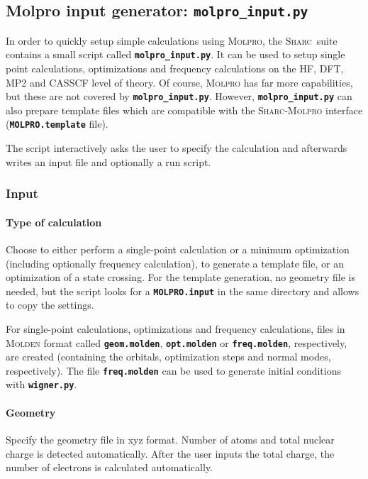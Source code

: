 \documentclass[a4paper,10pt,DIV=15,openany,twoside=false]{scrbook}
\newcommand{\sharc}{\textsc{Sharc}}
\newcommand{\ttt}[1]{\textbf{\texttt{#1}}}
\begin{document}
\subsection{Molpro input generator: \ttt{molpro\_input.py}}\label{sec:molpro_input.py}

In order to quickly setup simple calculations using \textsc{Molpro}, the \sharc\ suite contains a small script called \ttt{molpro\_input.py}. It can be used to setup single point calculations, optimizations and frequency calculations on the HF, DFT, MP2 and CASSCF level of theory. Of course, \textsc{Molpro} has far more capabilities, but these are not covered by \ttt{molpro\_input.py}. However, \ttt{molpro\_input.py} can also prepare template files which are compatible with the \sharc-\textsc{Molpro} interface (\ttt{MOLPRO.template} file).

The script interactively asks the user to specify the calculation and afterwards writes an input file and optionally a run script.

\subsubsection{Input}

\paragraph{Type of calculation}

Choose to either perform a single-point calculation or a minimum optimization (including optionally frequency calculation), to generate a template file, or an optimization of a state crossing. For the template generation, no geometry file is needed, but the script looks for a \ttt{MOLPRO.input} in the same directory and allows to copy the settings. 

For single-point calculations, optimizations and frequency calculations, files in \textsc{Molden} format called \ttt{geom.molden}, \ttt{opt.molden} or \ttt{freq.molden}, respectively, are created (containing the orbitals, optimization steps and normal modes, respectively). The file \ttt{freq.molden} can be used to generate initial conditions with \ttt{wigner.py}.

\paragraph{Geometry}

Specify the geometry file in xyz format. Number of atoms and total nuclear charge is detected automatically. After the user inputs the total charge, the number of electrons is calculated automatically.
\end{document}

